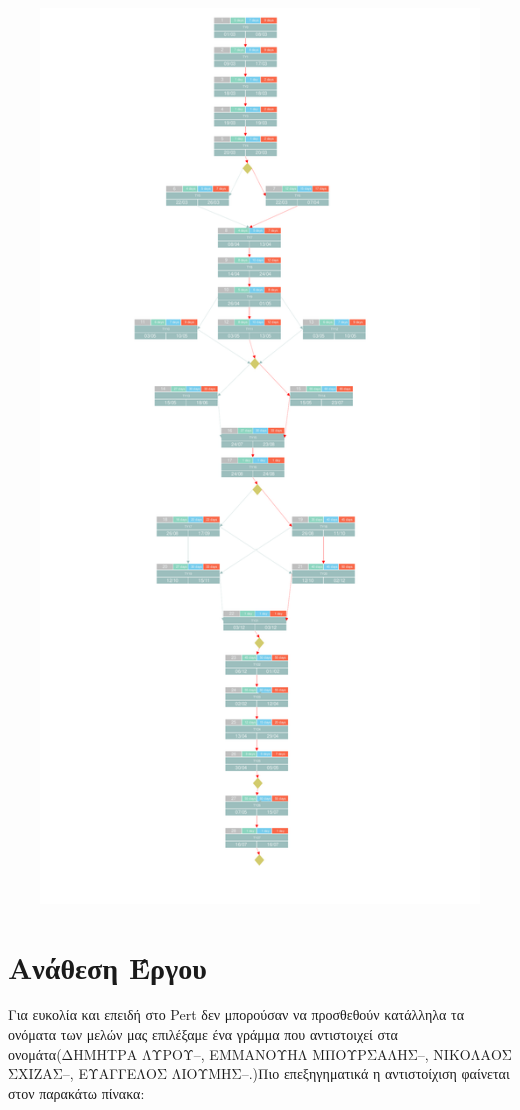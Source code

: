 \documentclass[12pt,a4paper,oneside]{article}
\begin{document}
\centerline{\includegraphics[width=17cm,height=23.7cm]{Pert plan.pdf}}


\newpage 
\section{Ανάθεση Έργου}\label{sec:meth}
Για ευκολία και επειδή στο Pert δεν μπορούσαν να προσθεθούν κατάλληλα τα ονόματα των μελών μας επιλέξαμε ένα γράμμα που αντιστοιχεί στα ονομάτα(ΔΗΜΗΤΡΑ ΛΥΡΟΥ--, ΕΜΜΑΝΟΥΗΛ ΜΠΟΥΡΣΑΛΗΣ--, ΝΙΚΟΛΑΟΣ ΣΧΙΖΑΣ--, ΕΥΑΓΓΕΛΟΣ ΛΙΟΥΜΗΣ--.)Πιο επεξηγηματικά η αντιστοίχιση φαίνεται στον παρακάτω πίνακα:
\end{document}
